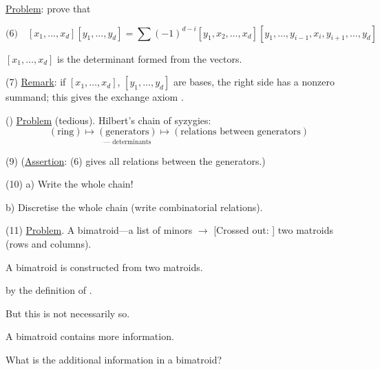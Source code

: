 \underline{Problem}: prove that

\begin{equation*}
\text{(6)}\quad
[x_1,\ldots,x_d][y_1,\ldots,y_d]
=\sum(-1)^{d-i}[y_1,x_2,\ldots,x_d]
[y_1,\ldots,y_{i-1},x_i,y_{i+1},\ldots,y_d]
\end{equation*}

$[x_1,\ldots,x_d]$ is the determinant formed from the vectors.

(7) \underline{Remark}: if $[x_1,\ldots,x_d]$, $[y_1,\ldots,y_d]$ are bases, the right side has
a nonzero summand; this gives the exchange axiom
.

()
\underline{Problem} (tedious). Hilbert's chain of syzygies:
\begin{equation*}
(\text{ring})\longmapsto
\underset{\text{--- determinants}}{(\text{generators})}
\longmapsto (\text{relations between generators})
\end{equation*}

(9) (\underline{Assertion}: (6) gives all relations between the generators.)

(10) a) Write the whole chain!

b) Discretise the whole chain (write combinatorial relations).

(11) \underline{Problem}. A bimatroid---a list of minors $\longrightarrow$
[Crossed out: ]
two matroids
(rows and columns).

A bimatroid is constructed from two matroids.




by the definition of .

But this is not necessarily so.

A bimatroid contains more information.

What is the additional information in a bimatroid?

